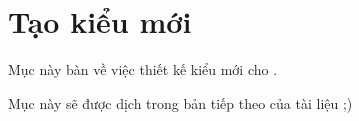 \section{\texorpdfstring{Tạo kiểu mới}{Tao kieu moi}}
\label{sec:writestyle}

Mục này bàn về việc thiết kế kiểu mới cho .

Mục này sẽ được dịch trong bản tiếp theo của tài liệu ;)

\endinput
